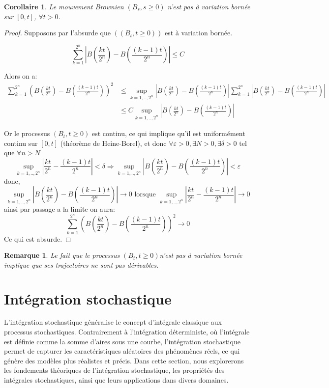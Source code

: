 \documentclass[A4paper,12pt]{report}
\newtheorem{remark}{Remarque}[chapter]
\newtheorem{corollary}{Corollaire}[chapter]
\begin{document}
\begin{corollary}
Le mouvement Brownien $(B_{s}, s\geq 0)$ n'est pas à variation bornée sur $[0,t]$, $\forall t>0$.
\end{corollary}

\begin{proof}
Supposons par l'absurde que  $\left(\left(B_{t}, t\geq 0\right)\right)$ est à variation bornée.

$$
 \sum_{k=1}^{2^{n}}\left| B\left(\frac{k t}{2^{n}}\right)-B\left(\frac{(k-1) t}{2^{n}}\right)\right|\leq C
$$

Alors on a:
\begin{align*}
\sum_{k=1}^{2^{n}} \left(B\left(\frac{k t}{2^{n}}\right)-B\left(\frac{(k-1) t}{2^{n}}\right) \right)^2 &\leq \sup_{k=1,..,2^n} \left| B\left(\frac{k t}{2^{n}}\right)-B\left(\frac{(k-1) t}{2^{n}}\right) \right| \sum_{k=1}^{2^{n}} \left| B\left(\frac{k t}{2^{n}}\right)-B\left(\frac{(k-1) t}{2^{n}}\right)\right|\\
&\leq C  \sup_{k=1,..,2^n} \left| B\left(\frac{k t}{2^{n}}\right)-B\left(\frac{(k-1) t}{2^{n}}\right) \right|
\end{align*}


Or le processus $\left(B_{t}, t \geq0 \right)$ est continu, ce qui implique qu'il est uniformément continu sur $[0, t]$ (théorème de Heine-Borel), et donc $\forall \varepsilon>0, \exists N>0, \exists \delta>0$ tel que $\forall n >N$
$$\sup_{k=1,..,2^n}\left|\frac{k t}{2^{n}}- \frac{(k-1) t}{2^{n}}\right| < \delta \Rightarrow \sup_{k=1,..,2^n} \left| B\left(\frac{k t}{2^{n}}\right)-B\left(\frac{(k-1) t}{2^{n}}\right) \right|< \varepsilon$$
donc, $$\sup_{k=1,..,2^n} \left| B\left(\frac{k t}{2^{n}}\right)-B\left(\frac{(k-1) t}{2^{n}}\right) \right| \longrightarrow 0 \text{ lorsque } \sup_{k=1,..,2^n}\left|\frac{k t}{2^{n}}- \frac{(k-1) t}{2^{n}}\right|\rightarrow 0$$
ainsi par passage a la limite on aura:
$$\sum_{k=1}^{2^{n}} \left(B\left(\frac{k t}{2^{n}}\right)-B\left(\frac{(k-1) t}{2^{n}}\right) \right)^2 \longrightarrow 0$$
Ce qui est absurde. 
\end{proof} 
\begin{remark}
Le fait que le processus $\left(B_{t}, t\geq 0 \right)$n'est pas à variation bornée implique que ses trajectoires ne sont pas dérivables.
\end{remark}
\section{Intégration stochastique }
L'intégration stochastique généralise le concept d'intégrale classique aux processus stochastiques. Contrairement à l'intégration déterministe, où l'intégrale est définie comme la somme d'aires sous une courbe, l'intégration stochastique  permet de capturer les caractéristiques aléatoires des phénomènes réels, ce qui génère des modèles plus réalistes et précis.
Dans cette section, nous explorerons les fondements théoriques de l'intégration stochastique, les propriétés des intégrales stochastiques, ainsi que leurs applications dans divers domaines.
\end{document}
